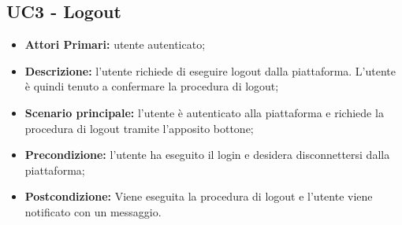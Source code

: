 \subsection{UC3 - Logout}
\begin{itemize}
	\item \textbf{Attori Primari:} utente autenticato;
	\item \textbf{Descrizione:} l'utente richiede di eseguire logout dalla piattaforma. L'utente è quindi tenuto a confermare la procedura di logout;
	\item \textbf{Scenario principale:} l'utente è autenticato alla piattaforma e richiede la procedura di logout tramite l'apposito bottone;
	\item \textbf{Precondizione:} l'utente ha eseguito il login e desidera disconnettersi dalla piattaforma;
	\item \textbf{Postcondizione:} Viene eseguita la procedura di logout e l'utente viene notificato con un messaggio.
\end{itemize}